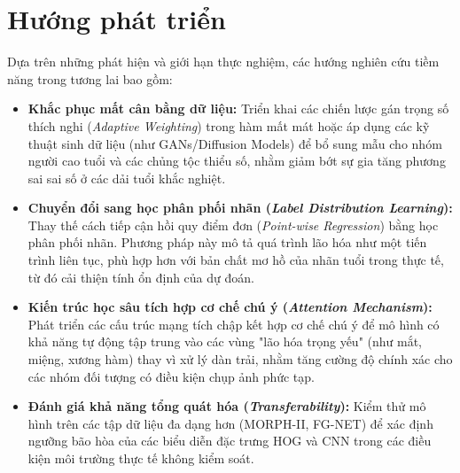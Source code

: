 \section{Hướng phát triển}
Dựa trên những phát hiện và giới hạn thực nghiệm, các hướng nghiên cứu tiềm năng trong tương lai bao gồm:

\begin{itemize}
    \item \textbf{Khắc phục mất cân bằng dữ liệu:} Triển khai các chiến lược gán trọng số thích nghi (\textit{Adaptive Weighting}) trong hàm mất mát hoặc áp dụng các kỹ thuật sinh dữ liệu (như GANs/Diffusion Models) để bổ sung mẫu cho nhóm người cao tuổi và các chủng tộc thiểu số, nhằm giảm bớt sự gia tăng phương sai sai số ở các dải tuổi khắc nghiệt.
    
    \item \textbf{Chuyển đổi sang học phân phối nhãn (\textit{Label Distribution Learning}):} Thay thế cách tiếp cận hồi quy điểm đơn (\textit{Point-wise Regression}) bằng học phân phối nhãn. Phương pháp này mô tả quá trình lão hóa như một tiến trình liên tục, phù hợp hơn với bản chất mơ hồ của nhãn tuổi trong thực tế, từ đó cải thiện tính ổn định của dự đoán.
    
    \item \textbf{Kiến trúc học sâu tích hợp cơ chế chú ý (\textit{Attention Mechanism}):} Phát triển các cấu trúc mạng tích chập kết hợp cơ chế chú ý để mô hình có khả năng tự động tập trung vào các vùng "lão hóa trọng yếu" (như mắt, miệng, xương hàm) thay vì xử lý dàn trải, nhằm tăng cường độ chính xác cho các nhóm đối tượng có điều kiện chụp ảnh phức tạp.
    
    \item \textbf{Đánh giá khả năng tổng quát hóa (\textit{Transferability}):} Kiểm thử mô hình trên các tập dữ liệu đa dạng hơn (MORPH-II, FG-NET) để xác định ngưỡng bão hòa của các biểu diễn đặc trưng HOG và CNN trong các điều kiện môi trường thực tế không kiểm soát.
\end{itemize}
